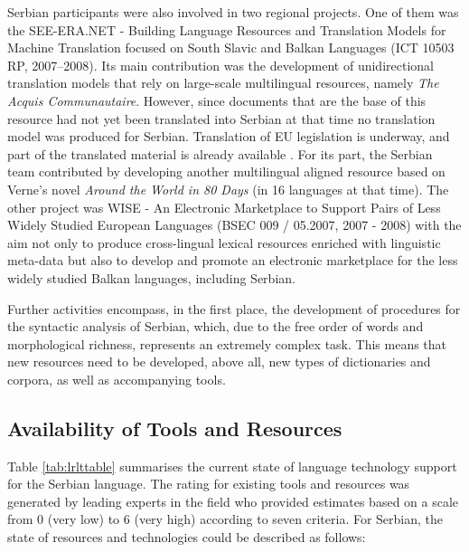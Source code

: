 \begin{multicols}{2}

Serbian participants were also involved in two regional projects. One of them was the SEE-ERA.NET - Building Language Resources and Translation Models for Machine Translation focused on South Slavic and Balkan Languages (ICT 10503 RP, 2007--2008). Its main contribution was the development of unidirectional translation models that rely on large-scale multilingual resources, namely \textit{The Acquis Communautaire}. However, since documents that are the base of this resource had not yet been translated into Serbian at that time no translation model was produced for Serbian. Translation of EU legislation is underway, and part of the translated material is already available \cite{PREVODJENJE}. For its part, the Serbian team contributed by developing another multilingual aligned resource based on Verne’s novel \textit{Around the World in 80 Days} (in 16 languages at that time).  The other project was WISE - An Electronic Marketplace to Support Pairs of Less Widely Studied European Languages (BSEC 009 / 05.2007, 2007 - 2008) with the aim not only to produce cross-lingual lexical resources enriched with linguistic meta-data but also to develop and promote an electronic marketplace for the less widely studied Balkan languages, including Serbian.

Further activities encompass, in the first place, the development of procedures for the syntactic analysis of Serbian, which, due to the free order of words and morphological richness, represents an extremely complex task. This means that new resources need to be developed, above all, new types of dictionaries and corpora, as well as accompanying tools.  


 \subsection {Availability of Tools and Resources}
   
 
Table \ref{tab:lrlttable} summarises the current state of language technology support for the Serbian language. The rating for existing tools and resources was generated by leading experts in the field who provided estimates based on a scale from 0 (very low) to 6 (very high) according to seven criteria.
For Serbian, the state of resources and technologies could be described as follows:


\end{multicols}
